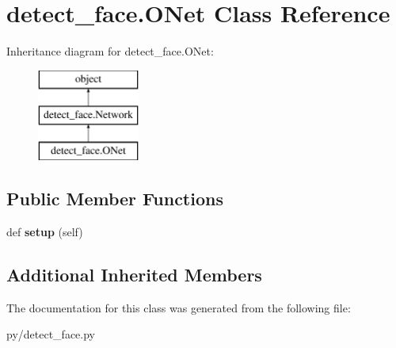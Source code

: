 \hypertarget{classdetect__face_1_1ONet}{}\section{detect\+\_\+face.\+O\+Net Class Reference}
\label{classdetect__face_1_1ONet}
Inheritance diagram for detect\+\_\+face.\+O\+Net\+:\begin{figure}[H]
\begin{center}
\leavevmode
\includegraphics[height=3.000000cm]{classdetect__face_1_1ONet}
\end{center}
\end{figure}
\subsection*{Public Member Functions}
\begin{DoxyCompactItemize}
\item 
def {\bfseries setup} (self)\hypertarget{classdetect__face_1_1ONet_a3ea3e2c1fbff5de5806bb9c54c817116}{}\label{classdetect__face_1_1ONet_a3ea3e2c1fbff5de5806bb9c54c817116}

\end{DoxyCompactItemize}
\subsection*{Additional Inherited Members}


The documentation for this class was generated from the following file\+:\begin{DoxyCompactItemize}
\item 
py/detect\+\_\+face.\+py\end{DoxyCompactItemize}
